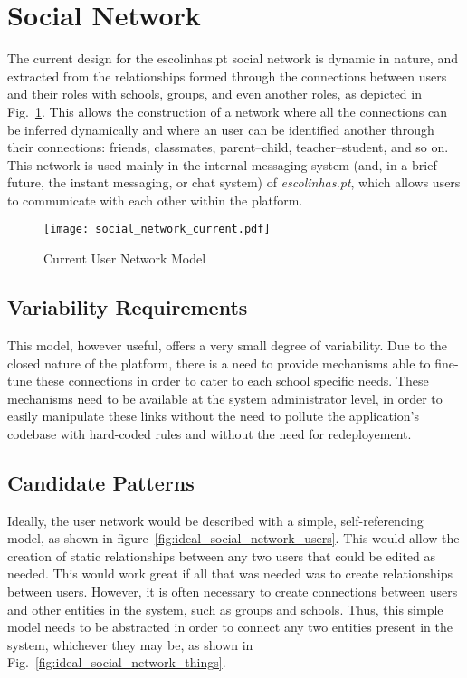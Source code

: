 \section{Social Network}\label{sec:fa_social_network}

The current design for the escolinhas.pt social network is dynamic in nature, and extracted from the relationships formed through the connections between users and their roles with schools, groups, and even another roles, as depicted in Fig.~\ref{fig:social_network_current}. This allows the construction of a network where all the connections can be inferred dynamically and where an user can be identified another through their connections: friends, classmates, parent--child, teacher--student, and so on. This network is used mainly in the internal messaging system (and, in a brief future, the instant messaging, or chat system) of \emph{escolinhas.pt}, which allows users to communicate with each other within the platform.

\begin{figure}[H]
  \centering
  \texttt{[image: social\_network\_current.pdf]}
  \caption{Current User Network Model}
  \label{fig:social_network_current}
\end{figure}

\subsection{Variability Requirements}\label{sec:fa_social_network_variability_requirements}

This model, however useful, offers a very small degree of variability. Due to the closed nature of the platform, there is a need to provide mechanisms able to fine-tune these connections in order to cater to each school specific needs. These mechanisms need to be available at the system administrator level, in order to easily manipulate these links without the need to pollute the application's codebase with hard-coded rules and without the need for redeployement.

\subsection{Candidate Patterns}\label{sec:fa_social_network_candidate_patterns}

Ideally, the user network would be described with a simple, self-referencing model, as shown in figure~\ref{fig:ideal_social_network_users}. This would allow the creation of static relationships between any two users that could be edited as needed. This would work great if all that was needed was to create relationships between users. However, it is often necessary to create connections between users and other entities in the system, such as groups and schools. Thus, this simple model needs to be abstracted in order to connect any two entities present in the system, whichever they may be, as shown in Fig.~\ref{fig:ideal_social_network_things}.


